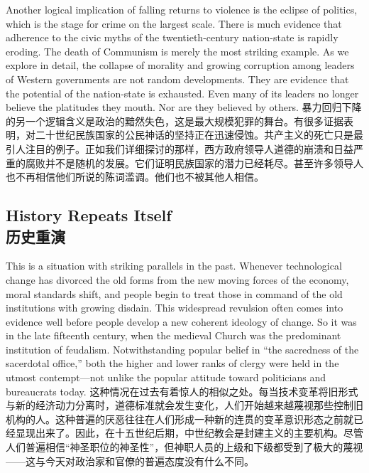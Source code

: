\begin{paracol}{2}[]
Another logical implication of falling returns to violence is the eclipse of politics, which is the stage for crime on the largest scale. There is much evidence that adherence to the civic myths of the twentieth-century nation-state is rapidly eroding. The death of Communism is merely the most striking example. As we explore in detail, the collapse of morality and growing corruption among leaders of Western governments are not random developments. They are evidence that the potential of the nation-state is exhausted. Even many of its leaders no longer believe the platitudes they mouth. Nor are they believed by others.
\switchcolumn
暴力回归下降的另一个逻辑含义是政治的黯然失色，这是最大规模犯罪的舞台。有很多证据表明，对二十世纪民族国家的公民神话的坚持正在迅速侵蚀。共产主义的死亡只是最引人注目的例子。正如我们详细探讨的那样，西方政府领导人道德的崩溃和日益严重的腐败并不是随机的发展。它们证明民族国家的潜力已经耗尽。甚至许多领导人也不再相信他们所说的陈词滥调。他们也不被其他人相信。
\end{paracol}

\subsection[历史重演]{History Repeats Itself \\历史重演}
\begin{paracol}{2}[]
This is a situation with striking parallels in the past. Whenever technological change has divorced the old forms from the new moving forces of the economy, moral standards shift, and people begin to treat those in command of the old institutions with growing disdain. This widespread revulsion often comes into evidence well before people develop a new coherent ideology of change. So it was in the late fifteenth century, when the medieval Church was the predominant institution of feudalism. Notwithstanding popular belief in “the sacredness of the sacerdotal office,” both the higher and lower ranks of clergy were held in the utmost contempt—not unlike the popular attitude toward politicians and bureaucrats today.
\switchcolumn
这种情况在过去有着惊人的相似之处。每当技术变革将旧形式与新的经济动力分离时，道德标准就会发生变化，人们开始越来越蔑视那些控制旧机构的人。这种普遍的厌恶往往在人们形成一种新的连贯的变革意识形态之前就已经显现出来了。因此，在十五世纪后期，中世纪教会是封建主义的主要机构。尽管人们普遍相信“神圣职位的神圣性”，但神职人员的上级和下级都受到了极大的蔑视——这与今天对政治家和官僚的普遍态度没有什么不同。
\end{paracol}

